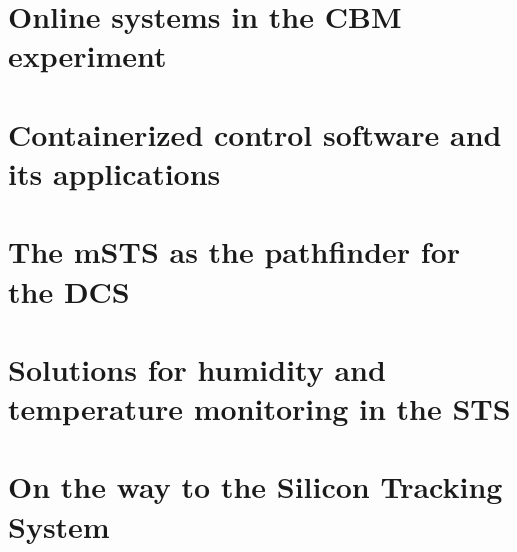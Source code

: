 \chapter{Online systems in the CBM experiment}
\label{chap:online_systems}




\chapter{Containerized control software and its applications}
\label{chap:containers}





\chapter{The mSTS as the pathfinder for the DCS}
\label{chap:msts}
        

\chapter{Solutions for humidity and temperature monitoring in the STS}
\label{chap:sts}



\chapter{On the way to the Silicon Tracking System}
\label{chap:outlook}




%

\renewcommand\listfigurename{List of Figures}
\listoffigures
\renewcommand\listtablename{List of Tables}
\listoftables
\clearpage


\clearpage
\printbibliography
\clearpage
\printglossaries


